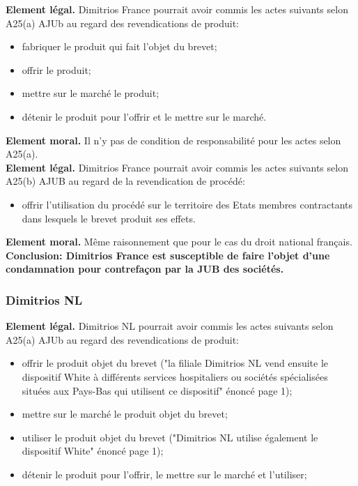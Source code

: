 \textbf{Element légal.} Dimitrios France pourrait avoir commis les actes suivants selon A25(a) AJUb
au regard des revendications de produit:
\begin{itemize}
    \item fabriquer le produit qui fait l'objet du brevet;
    \item offrir le produit;
    \item mettre sur le marché le produit;
    \item détenir le produit pour l'offrir et le mettre sur le marché.\\
\end{itemize}

\textbf{Element moral.} Il n'y pas de condition de responsabilité pour les actes selon A25(a).\\

\textbf{Element légal.} Dimitrios France pourrait avoir commis les actes suivants selon A25(b) AJUB
au regard de la revendication de procédé:
\begin{itemize}
    \item offrir l'utilisation du procédé sur le territoire des Etats membres contractants dans lesquels
    le brevet produit ses effets.\\
\end{itemize}

\textbf{Element moral.} Même raisonnement que pour le cas du droit national français.\\

\textbf{Conclusion: Dimitrios France est susceptible de faire l'objet d'une condamnation pour contrefaçon
par la JUB des sociétés.}

\subsubsection{Dimitrios NL}

\textbf{Element légal.} Dimitrios NL pourrait avoir commis les actes suivants selon A25(a) AJUb
au regard des revendications de produit:
\begin{itemize}
    \item offrir le produit objet du brevet ("la filiale Dimitrios NL vend ensuite le dispositif White
    à différents services hospitaliers ou sociétés spécialisées situées aux Pays-Bas qui utilisent ce
    dispositif" énoncé page 1);
    \item mettre sur le marché le produit objet du brevet;
    \item utiliser le produit objet du brevet ("Dimitrios NL utilise également le dispositif White"
    énoncé page 1);
    \item détenir le produit pour l'offrir, le mettre sur le marché et l'utiliser; 
\end{itemize}

